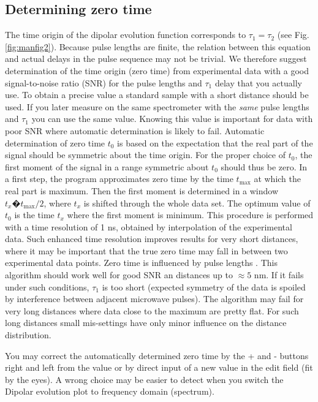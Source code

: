 \documentclass{article}
\begin{document}
\subsection{Determining zero time}
The time origin of the dipolar evolution function corresponds to $\tau_1 = \tau_2$ (see
Fig. \ref{fig:manfig2}). Because pulse lengths are finite, the relation between this equation and actual delays in the pulse sequence may not be trivial. We therefore suggest
determination of the time origin (zero time) from experimental data with a good
signal-to-noise ratio (SNR) for the pulse lengths and $\tau_1$ delay that you actually
use. To obtain a precise value a standard sample with a short distance should be used. If you later measure on the same spectrometer with the \emph{same} pulse lengths
and $\tau_1$ you can use the same value. Knowing this value is important for data
with poor SNR where automatic determination is likely to fail.
Automatic determination of zero time $t_0$ is based on the expectation that
the real part of the signal should be symmetric about the time origin. For the
proper choice of $t_0$, the first moment of the signal in a range symmetric about
$t_0$ should thus be zero. In a first step, the program approximates zero time by
the time $t_{\mathrm{max}}$ at which the real part is maximum. Then the first moment is
determined in a window $t_x�t_{\mathrm{max}}/2$, where $t_x$ is shifted through the whole data
set. The optimum value of $t_0$ is the time $t_x$ where the first moment is minimum. This procedure is performed with a time resolution of 1 ns, obtained by interpolation of the experimental data. Such enhanced time resolution improves results for very short distances, where it may be important that the true zero time may fall in between two experimental data points. Zero time is influenced by pulse lengths \cite{maryasov2000,milov2004}. This
algorithm should work well for good SNR an distances up to $\approx5$ nm. If it fails
under such conditions, $\tau_1$ is too short (expected symmetry of the data is spoiled
by interference between adjacent microwave pulses). The algorithm may fail
for very long distances where data close to the maximum are pretty flat. For
such long distances small mis-settings have only minor influence on the distance
distribution.

You may correct the automatically determined zero time by the {\ttfamily +} and {\ttfamily -}
buttons right and left from the value or by direct input of a new value in the edit field
(fit by the eyes). A wrong choice may be easier to detect when you switch
the {\ttfamily Dipolar evolution} plot to frequency domain ({\ttfamily spectrum}).
\end{document}
